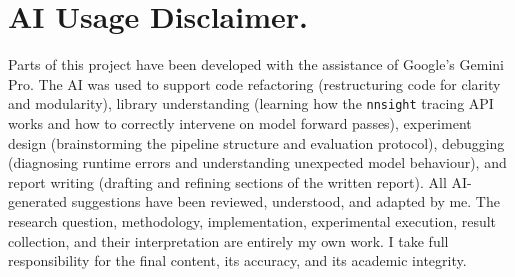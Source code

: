\section*{AI Usage Disclaimer.}
Parts of this project have been developed with the assistance of Google's Gemini
Pro. The AI was used to support code refactoring (restructuring code for clarity
and modularity), library understanding (learning how the \texttt{nnsight}
tracing API works and how to correctly intervene on model forward passes),
experiment design (brainstorming the pipeline structure and evaluation protocol),
debugging (diagnosing runtime errors and understanding unexpected model
behaviour), and report writing (drafting and refining sections of the written
report). All AI-generated suggestions have been reviewed, understood, and
adapted by me. The research question, methodology, implementation, experimental
execution, result collection, and their interpretation are entirely my own work.
I take full responsibility for the final content, its accuracy, and its academic
integrity.
